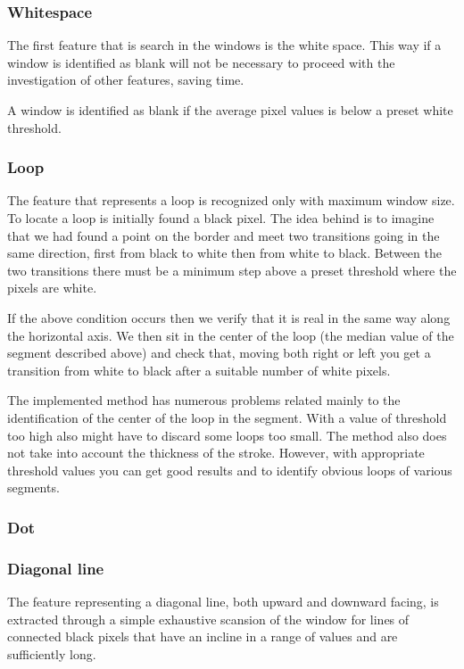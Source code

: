 \documentclass[a4paper,12pt]{article}
\begin{document}

\subsubsection{Whitespace}  

The first feature that is search in the windows is the white space. This way if a window is identified as blank will not be necessary to proceed with the investigation of other features, saving time.

A window is identified as blank if the average pixel values is below a preset white threshold.

\subsubsection{Loop}

The feature that represents a loop is recognized only with maximum window size.
To locate a loop is initially found a black pixel. The idea behind is to imagine that we had found a point on the border and meet two transitions going in the same direction, first from black to white then from white to black. Between the two transitions there must be a minimum step above a preset threshold where the pixels are white.

If the above condition occurs then we verify that it is real in the same way along the horizontal axis. We then sit in the center of the loop (the median value of the segment described above) and check that, moving both right or left you get a transition from white to black after a suitable number of white pixels.

The implemented method has numerous problems related mainly to the identification of the center of the loop in the segment. With a value of threshold too high also might have to discard some loops too small. The method also does not take into account the thickness of the stroke.
However, with appropriate threshold values you can get good results and to identify obvious loops of various segments.

\subsubsection{Dot}

\subsubsection{Diagonal line}
The feature representing a diagonal line, both upward and downward facing, is extracted through a simple exhaustive scansion of the window for lines of connected black pixels that have an incline in a range of values and are sufficiently long.
\end{document}
